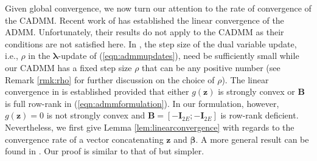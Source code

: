 \documentclass[journal]{IEEEtran}
\begin{document}
Given global convergence, we now turn our attention to the rate of convergence of the CADMM. Recent work of \cite{Hong2012, Deng2016}
has established the linear convergence of the ADMM. Unfortunately, their results do not apply to the CADMM as their conditions are not satisfied here. In \cite{Hong2012}, the step size of the dual variable update, i.e., $\rho$ in the $\bm\lambda$-update of (\ref{eqn:admmupdates}), need be sufficiently small while our CADMM has a fixed step size $\rho$ that can be any positive number (see Remark \ref{rmk:rho} for further discussion on the choice of $\rho$). The linear convergence in \cite{Deng2016} is established provided that either $g(\bm z)$ is strongly convex or $\bm B$ is full row-rank in (\ref{eqn:admmformulation}). In our formulation, however, $g(\bm z)=0$ is not strongly convex and $\bm B=[-\bm I_{2E};-\bm I_{2E}]$ is row-rank deficient. Nevertheless, we first give Lemma \ref{lem:linearconvergence} with regards to the convergence rate of a vector concatenating $\bm z$ and $\bm \beta$. A more general result can be found in \cite[Theorem 1]{Shi2014}. Our proof is similar to that of \cite{Shi2014} but simpler.
\end{document}
